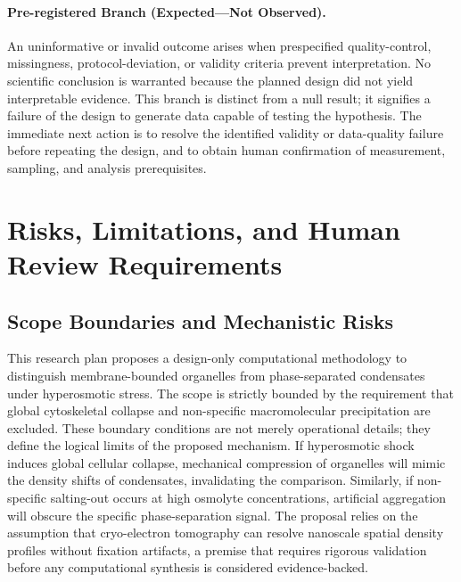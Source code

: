 \documentclass[conference]{IEEEtran}
\begin{document}
\paragraph{Pre-registered Branch (Expected---Not Observed).} An uninformative or invalid outcome arises when prespecified quality-control, missingness, protocol-deviation, or validity criteria prevent interpretation. No scientific conclusion is warranted because the planned design did not yield interpretable evidence. This branch is distinct from a null result; it signifies a failure of the design to generate data capable of testing the hypothesis. The immediate next action is to resolve the identified validity or data-quality failure before repeating the design, and to obtain human confirmation of measurement, sampling, and analysis prerequisites.~\cite{cite_06a078fea514798a,cite_90e000f6b0c99ee8}

\section{Risks, Limitations, and Human Review Requirements}
\subsection{Scope Boundaries and Mechanistic Risks}
This research plan proposes a design-only computational methodology to distinguish membrane-bounded organelles from phase-separated condensates under hyperosmotic stress. The scope is strictly bounded by the requirement that global cytoskeletal collapse and non-specific macromolecular precipitation are excluded. These boundary conditions are not merely operational details; they define the logical limits of the proposed mechanism. If hyperosmotic shock induces global cellular collapse, mechanical compression of organelles will mimic the density shifts of condensates, invalidating the comparison. Similarly, if non-specific salting-out occurs at high osmolyte concentrations, artificial aggregation will obscure the specific phase-separation signal. The proposal relies on the assumption that cryo-electron tomography can resolve nanoscale spatial density profiles without fixation artifacts, a premise that requires rigorous validation before any computational synthesis is considered evidence-backed.~\cite{cite_3480a6462f7a2d86,cite_3222d2eeb7add195,cite_42ed299a53990c06}
\end{document}
